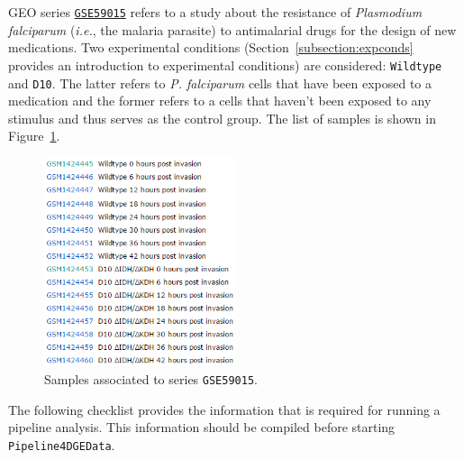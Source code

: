 \documentclass[final,letterpaper,12pt]{article}
\begin{document}
\par GEO series \href{https://www.ncbi.nlm.nih.gov/geo/query/acc.cgi?acc=GSE59015}{\texttt{GSE59015}} refers to a study about the resistance of \textit{Plasmodium falciparum} (\textit{i.e.}, the malaria parasite) to antimalarial drugs for the design of new medications. Two experimental conditions (Section~\ref{subsection:expconds} provides an introduction to experimental conditions) are considered: \texttt{Wildtype} and \texttt{D10}. The latter refers to \textit{P. falciparum} cells that have been exposed to a medication and the former refers to a cells that haven't been exposed to any stimulus and thus serves as the control group. The list of samples is shown in Figure~\ref{fig:GSE59015samples}.

\begin{figure}
	\centering
	\includegraphics[width=0.5\textwidth]{GSE59015samples}
	\caption{Samples associated to series \texttt{GSE59015}.}
	\label{fig:GSE59015samples}
\end{figure}

\par The following checklist provides the information that is required for running a pipeline analysis. This information should be compiled before starting \texttt{Pipeline4DGEData}.
\end{document}
